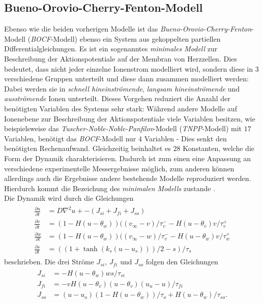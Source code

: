 \subsection{Bueno-Orovio-Cherry-Fenton-Modell}
Ebenso wie die beiden vorherigen Modelle ist das \textit{Bueno-Orovio-Cherry-Fenton}-Modell (\textit{BOCF}-Modell) ebenso ein System aus gekoppelten partiellen Differentialgleichungen. Es ist ein sogenanntes \textit{minimales Modell} zur Beschreibung der Aktionspotentiale auf der Membran von Herzzellen. Dies bedeutet, dass nicht jeder einzelne Ionenstrom modelliert wird, sondern diese in 3 verschiedene Gruppen unterteilt und diese dann zusammen modelliert werden: Dabei werden sie in \textit{schnell hineinströmende}, \textit{langsam hineinströmende} und \textit{ausströmende} Ionen unterteilt. Dieses Vorgehen reduziert die Anzahl der benötigten Variablen des Systems sehr stark: Während andere Modelle auf Ionenebene zur Beschreibung der Aktionspotentiale viele Variablen besitzen, wie beispielsweise das \textit{Tuscher-Noble-Noble-Panfilov}-Modell (\textit{TNPP}-Modell) mit $17$ Variablen, benötigt das \textit{BOCF}-Modell nur $4$ Variablen - Dies senkt den benötigten Rechenaufwand. Gleichzeitig beinhaltet es $28$ Konstanten, welche die Form der Dynamik charakterisieren. Dadurch ist zum einen eine Anpassung an verschiedene experimentelle Messergebnisse möglich, zum anderen können allerdings auch die Ergebnisse andere bestehende Modelle reproduziert werden. Hierdurch kommt die Bezeichung des \textit{minimalen Modells} zustande \citep{Bueno-Orovio2008}.\\

Die Dynamik wird durch die Gleichungen 
\begin{align}
\begin{aligned}
\frac{\partial u}{\partial t} &= D \nabla^2 u + - (J_{si} + J_{fi} + J_{so})\\
\frac{\partial v}{\partial t} &= (1-H(u-\theta_w))((v_\infty - v)/\tau_v^- - H(u-\theta_v)v/\tau_v^+ \\
\frac{\partial w}{\partial t} &= (1-H(u-\theta_w))((v_\infty - w)/\tau_v^- - H(u-\theta_w)v/\tau_w^+ \\
\frac{\partial s}{\partial t} &= ((1 + \tanh(k_s(u-u_s)))/2 - s)/\tau_s
\end{aligned}
\end{align}
beschrieben. Die drei Ströme $J_{si}$, $J_{fi}$ und $J_{so}$ folgen den Gleichungen
\begin{align}
\begin{aligned}
J_{si} &= -H(u-\theta_w)ws/\tau_{si} \\
J_{fi} &= -vH(u-\theta_v)(u-\theta_v)(u_u - u)/\tau_{fi} \\
J_{so} &= (u-u_o)(1-H(u-\theta_w))/\tau_o + H(u-\theta_w)/\tau_{so}.
\end{aligned}
\end{align}

